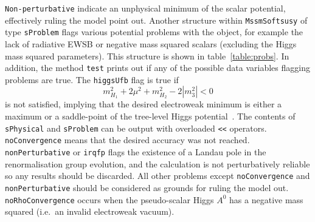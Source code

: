 \documentclass{article}
\def\code#1{\small{\tt #1}\normalsize}
\begin{document}
\code{Non-perturbative} indicate an
unphysical minimum of the scalar potential, effectively ruling the model point 
out.
Another structure within \code{MssmSoftsusy} of type \code{sProblem} flags
various potential problems 
with the object, for example the lack of radiative EWSB
or negative mass squared scalars (excluding the Higgs mass squared
parameters). 
This structure is shown in table~\ref{table:probs}. In addition, the method
\code{test} 
prints out if any of the possible data variables flagging problems are true.
The \code{higgsUfb} flag is true if
\begin{equation}
m_{H_1}^2 + 2 \mu^2 + m_{H_2}^2 - 2 |m_3^2| <0 \label{higgsufb}
\end{equation}
is not satisfied, implying that the desired electroweak minimum is either a
maximum or a saddle-point of the tree-level Higgs
potential~\cite{Barger:1994gh}. The contents of \code{sPhysical} and
\code{sProblem} can be output with overloaded \code{<<} operators.
\code{noConvergence} means that the desired
accuracy was not reached. \code{nonPerturbative} or \code{irqfp} flags the
existence of a Landau pole in the renormalisation group evolution, and the
calculation is not perturbatively reliable so any results should be discarded.
All other problems except \code{noConvergence} and
\code{nonPerturbative} should be
considered as grounds for ruling the model out.
\code{noRhoConvergence} occurs when the pseudo-scalar Higgs $A^0$ has 
a negative mass squared (i.e.\ an invalid electroweak vacuum).
\end{document}
